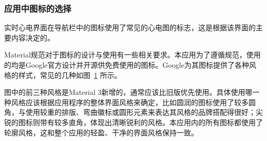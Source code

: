 \subsubsection{应用中图标的选择}\label{subsubsec:icons}

实时心电界面在导航栏中的图标使用了常见的心电图的标志，这是根据该界面的主要内容决定的。

Material规范对于图标的设计与使用有一些相关要求。本应用为了遵循规范，使用的均是Google官方设计并开源供免费使用的图标。Google为其图标提供了各种风格的样式，常见的几种如图~\ref{fig:icons} 所示。

\begin{figure}[!ht]
    \centering
    \label{fig:icons}
\end{figure}

图中的前三种风格是Material 3新增的，通常应该比旧版优先使用。具体使用哪一种风格应该根据应用程序的整体界面风格来确定，比如圆润的图标使用了较多圆角，与使用较重的排版、弯曲徽标或圆形元素来表达其风格的品牌搭配得很好；尖锐的图标则带有较多直角，体现出清晰锐利的风格。本应用内的所有图标都使用了轮廓风格，这和整个应用的轻盈、干净的界面风格保持一致。

